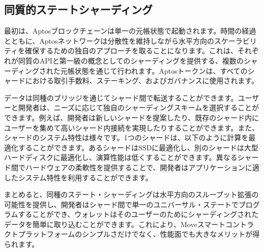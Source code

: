 \documentclass{article}
\begin{document}
\subsection{同質的ステートシャーディング}

最初は、Aptosブロックチェーンは単一の元帳状態で起動されます。時間の経過とともに、Aptosネットワークは分散性を維持しながら水平方向のスケーラビリティを確保するための独自のアプローチを取ることになります。これは、それぞれが同質のAPIと第一級の概念としてのシャーディングを提供する、複数のシャーディングされた元帳状態を通じて行われます。Aptosトークンは、すべてのシャードにおける取引手数料、ステーキング、およびガバナンスに使用されます。

データは同種のブリッジを通じてシャード間で転送することができます。ユーザーと開発者は、ニーズに応じて独自のシャーディングスキームを選択することができます。例えば、開発者は新しいシャードを提案したり、既存のシャード内にユーザーを集めて高いシャード内接続を実現したりすることができます。また、シャードのシステム特性は様々です。1つのシャードは、以下のように計算を最適化することができます。あるシャードはSSDに最適化し、別のシャードは大型ハードディスクに最適化し、演算性能は低くすることができます。異なるシャード間でハードウェアの柔軟性を提供することで、開発者はアプリケーションに適したシステム特性を利用することができます。

まとめると、同種のステート・シャーディングは水平方向のスループット拡張の可能性を提供し、開発者はシャード間で単一のユニバーサル・ステートでプログラムすることができ、ウォレットはそのユーザーのためにシャーディングされたデータを簡単に取り込むことができます。これにより、Moveスマートコントラクトプラットフォームのシンプルさだけでなく、性能面でも大きなメリットが得られます。


\small{

}
\end{document}

